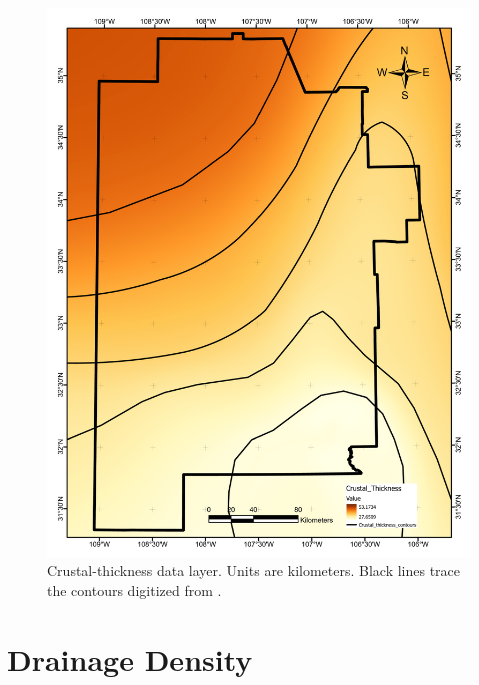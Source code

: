 \begin{figure}[H]
\centering
\includegraphics[width=0.75\linewidth]{templates/images/Figure-CrustalThickness.pdf}
\caption[Crustal thickness data layer]{Crustal-thickness data layer. Units are kilometers. Black lines trace the contours digitized from \protect\citet[Figure 4,][]{keller_comparative_1991}.}
\label{fig:feat_crust}
\end{figure}

\section{Drainage Density}\label{app:dl_drainage_density}

